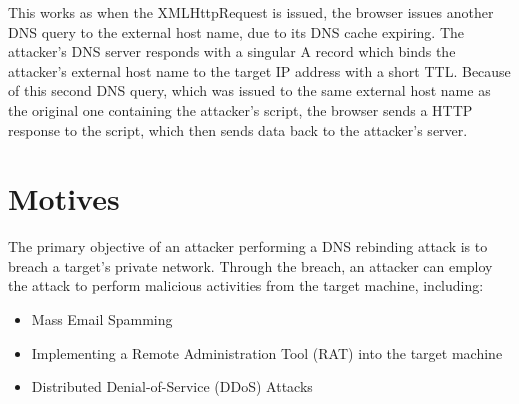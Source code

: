 \vspace{0.5cm}

This works as when the XMLHttpRequest is issued, the browser issues another DNS
query to the external host name, due to its DNS cache expiring. The attacker's
DNS server responds with a singular A record which binds the attacker's
external
host name to the target IP address with a short TTL. Because of this second
DNS query, which was issued to the same external host name as the original one
containing the attacker's script, the browser sends a HTTP response to the
script, which then sends data back to the attacker's server.

\section{Motives}

The primary objective of an attacker performing a DNS rebinding attack is to
breach a target's private network. Through the breach, an attacker can employ
the attack to perform malicious activities from the target machine, including:
\begin{itemize}
	\item{Mass Email Spamming}
\item{Implementing a Remote Administration Tool (RAT) into the target machine}
	\item{Distributed Denial-of-Service (DDoS) Attacks}
\end{itemize}
